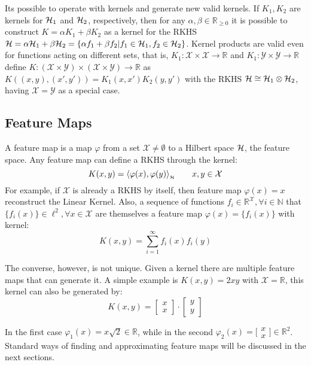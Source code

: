 Its possible to operate with kernels and generate new valid kernels. If
$K_1,K_2$ are kernels for $\mathcal{H}_1$ and $\mathcal{H}_2$, respectively, then for any
$\alpha,\beta \in \mathbb{R}_{\scriptstyle\geq0}$ it is possible to construct $K
= \alpha K_1 + \beta K_2$ as a kernel for the RKHS $\mathcal{H} = \alpha\mathcal{H}_1 +
\beta\mathcal{H}_2 = \{ \alpha f_1 + \beta f_2 | f_1 \in \mathcal{H}_1, f_2 \in
\mathcal{H}_2\}$. Kernel products are valid even for functions acting on different sets,
that is, $K_1:\mathcal{X}\times\mathcal{X}\to\mathbb{R}$ and
$K_1:\mathcal{Y}\times\mathcal{Y}\to\mathbb{R}$ define
$K:(\mathcal{X}\times\mathcal{Y})\times(\mathcal{X}\times\mathcal{Y})\to\mathbb{R}$
as $K((x,y),(x',y'))=K_1(x,x')K_2(y,y')$ with the RKHS $\mathcal{H} \cong \mathcal{H}_1 \otimes
\mathcal{H}_2$, having $\mathcal{X}=\mathcal{Y}$ as a special case.

\subsection{Feature Maps}

A feature map is a map $\varphi$ from a set $\mathcal{X}\neq\emptyset$ to a
Hilbert space $\mathcal{H}$, the feature space. Any feature map can define a RKHS
through the kernel:
\begin{equation}
\label{eq:feature_kernel}
K(x,y)=\langle \varphi(x),\varphi(y)\rangle_{_{\mathcal{H}}} \qquad x,y \in \mathcal{X}
\end{equation}
For example, if $\mathcal{X}$ is already a RKHS by itself, then feature
map $\varphi(x)=x$ reconstruct the Linear Kernel. Also, a sequence of functions
$f_i \in \mathbb{R}^\mathcal{X}, \forall i \in \mathbb{N}$ that $\{f_i(x)\}
\in \ell^2, \forall x \in \mathcal{X}$ are themselves a feature map
$\varphi(x)=\{f_i(x)\}$ with kernel:
\begin{equation*}
K(x,y) = \sum_{i=1}^\infty f_i(x) f_i(y)
\end{equation*}

The converse, however, is not unique. Given a kernel there are multiple feature
maps that can generate it. A simple example is $K(x,y)=2xy$ with
$\mathcal{X}=\mathbb{R}$, this kernel can also be generated by:
\begin{equation*}
K(x,y) = \begin{bmatrix}x \\ x\end{bmatrix}\cdot\begin{bmatrix}y \\
y\end{bmatrix}
\end{equation*}

In the first case $\varphi_1(x)=x {\scriptstyle\sqrt{2}} \in \mathbb{R}$, while
in the second $\varphi_2(x)=\bigl[\begin{smallmatrix}x \\
x\end{smallmatrix}\bigr] \in \mathbb{R}^2$. Standard ways of finding and
approximating feature maps will be discussed in the next sections.